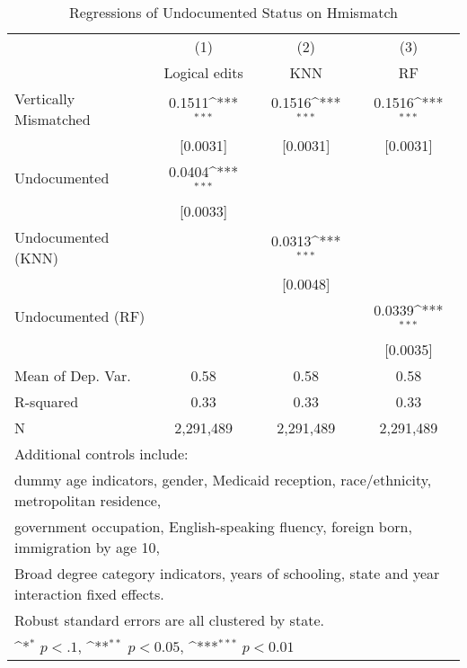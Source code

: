 \begin{table}[htbp]\centering
\def\sym#1{\ifmmode^{#1}\else\(^{#1}\)\fi}
\caption{Regressions of Undocumented Status on Hmismatch}
\begin{tabular}{l*{3}{c}}
\toprule
                    &\multicolumn{1}{c}{(1)}         &\multicolumn{1}{c}{(2)}         &\multicolumn{1}{c}{(3)}         \\
                    &Logical edits         &         KNN         &          RF         \\
\midrule
Vertically Mismatched&      0.1511\sym{***}&      0.1516\sym{***}&      0.1516\sym{***}\\
                    &    [0.0031]         &    [0.0031]         &    [0.0031]         \\
\addlinespace
Undocumented        &      0.0404\sym{***}&                     &                     \\
                    &    [0.0033]         &                     &                     \\
\addlinespace
Undocumented (KNN)  &                     &      0.0313\sym{***}&                     \\
                    &                     &    [0.0048]         &                     \\
\addlinespace
Undocumented (RF)   &                     &                     &      0.0339\sym{***}\\
                    &                     &                     &    [0.0035]         \\
\midrule
Mean of Dep. Var.   &        0.58         &        0.58         &        0.58         \\
R-squared           &        0.33         &        0.33         &        0.33         \\
N                   &   2,291,489         &   2,291,489         &   2,291,489         \\
\bottomrule
\multicolumn{4}{l}{\footnotesize Additional controls include:}\\
\multicolumn{4}{l}{\footnotesize dummy age indicators, gender, Medicaid reception, race/ethnicity, metropolitan residence,}\\
\multicolumn{4}{l}{\footnotesize government occupation, English-speaking fluency, foreign born, immigration by age 10,}\\
\multicolumn{4}{l}{\footnotesize Broad degree category indicators, years of schooling, state and year interaction fixed effects.}\\
\multicolumn{4}{l}{\footnotesize Robust standard errors are all clustered by state.}\\
\multicolumn{4}{l}{\footnotesize \sym{*} \(p<.1\), \sym{**} \(p<0.05\), \sym{***} \(p<0.01\)}\\
\end{tabular}
\end{table}
